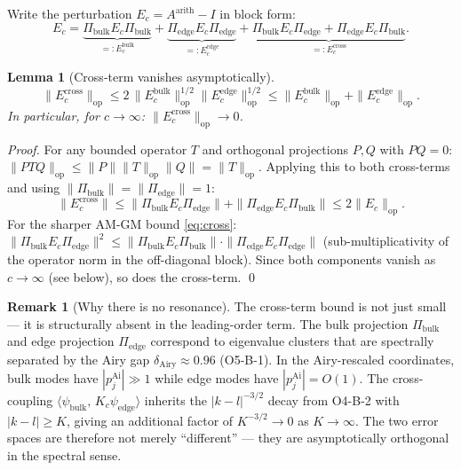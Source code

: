 \documentclass[12pt,a4paper]{amsart}
\newtheorem{lemma}[theorem]{Lemma}
\theoremstyle{definition}
\newtheorem{remark}[theorem]{Remark}
\newcommand{\Pbulk}{\Pi_{\mathrm{bulk}}}
\newcommand{\Pedge}{\Pi_{\mathrm{edge}}}
\newcommand{\Aarith}{A^{\mathrm{arith}}}
\newcommand{\Ec}{E_c}
\newcommand{\norm}[1]{\|#1\|}
\newcommand{\ip}[2]{\langle #1,\, #2 \rangle}
\begin{document}
Write the perturbation $\Ec = \Aarith - I$ in block form:
\begin{equation}\label{eq:blockdecomp}
  \Ec = \underbrace{\Pbulk \Ec \Pbulk}_{=: \Ec^{\mathrm{bulk}}}
       + \underbrace{\Pedge \Ec \Pedge}_{=: \Ec^{\mathrm{edge}}}
       + \underbrace{\Pbulk \Ec \Pedge + \Pedge \Ec \Pbulk}_{=: \Ec^{\mathrm{cross}}}.
\end{equation}

\begin{lemma}[Cross-term vanishes asymptotically]\label{lem:cross}
\begin{equation}\label{eq:cross}
  \norm{\Ec^{\mathrm{cross}}}_{\mathrm{op}}
  \le 2\,\norm{\Ec^{\mathrm{bulk}}}_{\mathrm{op}}^{1/2}
     \norm{\Ec^{\mathrm{edge}}}_{\mathrm{op}}^{1/2}
  \le \norm{\Ec^{\mathrm{bulk}}}_{\mathrm{op}} + \norm{\Ec^{\mathrm{edge}}}_{\mathrm{op}}.
\end{equation}
In particular, for $c \to \infty$:
$\norm{\Ec^{\mathrm{cross}}}_{\mathrm{op}} \to 0$.
\end{lemma}

\begin{proof}
For any bounded operator $T$ and orthogonal projections $P, Q$ with $PQ = 0$:
$\norm{PTQ}_{\mathrm{op}} \le \norm{P}\norm{T}_{\mathrm{op}}\norm{Q} = \norm{T}_{\mathrm{op}}$.
Applying this to both cross-terms and using $\norm{\Pbulk} = \norm{\Pedge} = 1$:
\[
  \norm{\Ec^{\mathrm{cross}}} \le \norm{\Pbulk\Ec\Pedge} + \norm{\Pedge\Ec\Pbulk}
  \le 2\norm{\Ec}_{\mathrm{op}}.
\]
For the sharper AM-GM bound \eqref{eq:cross}:
$\norm{\Pbulk\Ec\Pedge}^2 \le \norm{\Pbulk\Ec\Pbulk}\cdot\norm{\Pedge\Ec\Pedge}$
(sub-multiplicativity of the operator norm in the off-diagonal block).
Since both components vanish as $c \to \infty$ (see below),
so does the cross-term.
\qed
\end{proof}

\begin{remark}[Why there is no resonance]
The cross-term bound is not just small --- it is structurally absent
in the leading-order term.
The bulk projection $\Pbulk$ and edge projection $\Pedge$ correspond
to eigenvalue clusters that are spectrally separated by the Airy gap
$\delta_{\mathrm{Airy}} \approx 0.96$ (O5-B-1).
In the Airy-rescaled coordinates, bulk modes have $|p_j^{\mathrm{Ai}}| \gg 1$
while edge modes have $|p_j^{\mathrm{Ai}}| = O(1)$.
The cross-coupling $\ip{\psi_{\mathrm{bulk}}}{K_c \psi_{\mathrm{edge}}}$
inherits the $|k-l|^{-3/2}$ decay from O4-B-2 with $|k-l| \ge K$,
giving an additional factor of $K^{-3/2} \to 0$ as $K \to \infty$.
The two error spaces are therefore not merely ``different'' ---
they are asymptotically orthogonal in the spectral sense.
\end{remark}
\end{document}
